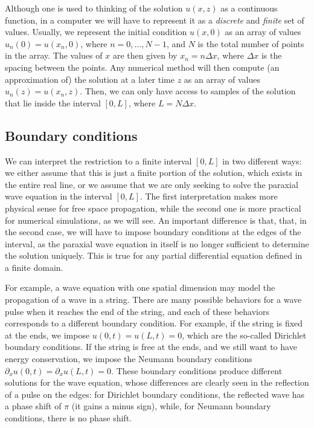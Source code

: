 \documentclass[a4paper,10pt]{report}
\begin{document}
Although one is used to thinking of the solution $u(x,z)$ as a continuous function, in a computer we will have to represent it as a \textit{discrete} and \textit{finite} set of values. Usually, we represent the initial condition $u(x,0)$ as an array of values $u_n(0) = u(x_n, 0)$, where $n = 0, \ldots, N-1$, and $N$ is the total number of points in the array. The values of $x$ are then given by $x_n = n \Delta x$, where $\Delta x$ is the spacing between the points. Any numerical method will then compute (an approximation of) the solution at a later time $z$ as an array of values $u_n(z) = u(x_n, z)$. Then, we can only have access to samples of the solution that lie inside the interval $[0, L]$, where $L = N \Delta x$.

\subsection{Boundary conditions}

We can interpret the restriction to a finite interval $[0, L]$ in two different ways: we either assume that this is just a finite portion of the solution, which exists in the entire real line, or we assume that we are only seeking to solve the paraxial wave equation in the interval $[0, L]$. The first interpretation makes more physical sense for free space propagation, while the second one is more practical for numerical simulations, as we will see. An important difference is that, that, in the second case, we will have to impose boundary conditions at the edges of the interval, as the paraxial wave equation in itself is no longer sufficient to determine the solution uniquely. This is true for any partial differential equation defined in a finite domain. 

For example, a wave equation with one spatial dimension may model the propagation of a wave in a string. There are many possible behaviors for a wave pulse when it reaches the end of the string, and each of these behaviors corresponds to a different boundary condition. For example, if the string is fixed at the ends, we impose $u(0,t) = u(L,t) = 0$, which are the so-called Dirichlet boundary conditions. If the string is free at the ends, and we still want to have energy conservation, we impose the Neumann boundary conditions $\partial_x u(0,t) = \partial_x u(L,t) = 0$. These boundary conditions produce different solutions for the wave equation, whose differences are clearly seen in the reflection of a pulse on the edges: for Dirichlet boundary conditions, the reflected wave has a phase shift of $\pi$ (it gains a minus sign), while, for Neumann boundary conditions, there is no phase shift.
\end{document}
